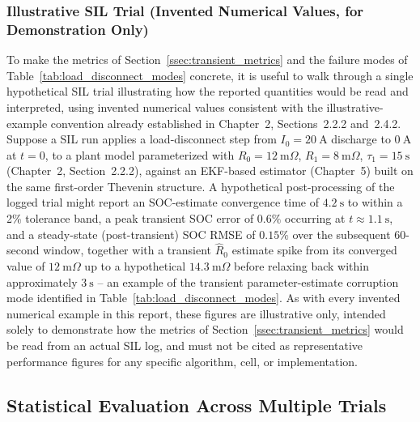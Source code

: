 \subsubsection{Illustrative SIL Trial (Invented Numerical Values, for Demonstration Only)}
\label{sssec:sil_illustrative_example}

To make the metrics of Section~\ref{ssec:transient_metrics} and the failure modes of Table~\ref{tab:load_disconnect_modes} concrete, it is useful to walk through a single hypothetical SIL trial illustrating how the reported quantities would be read and interpreted, using invented numerical values consistent with the illustrative-example convention already established in Chapter~2, Sections~2.2.2 and~2.4.2. Suppose a SIL run applies a load-disconnect step from $I_0 = 20\ \text{A}$ discharge to $0\ \text{A}$ at $t = 0$, to a plant model parameterized with $R_0 = 12\ \text{m}\Omega$, $R_1 = 8\ \text{m}\Omega$, $\tau_1 = 15\ \text{s}$ (Chapter~2, Section~2.2.2), against an EKF-based estimator (Chapter~5) built on the same first-order Thevenin structure. A hypothetical post-processing of the logged trial might report an SOC-estimate convergence time of $4.2\ \text{s}$ to within a 2\% tolerance band, a peak transient SOC error of $0.6\%$ occurring at $t \approx 1.1\ \text{s}$, and a steady-state (post-transient) SOC RMSE of $0.15\%$ over the subsequent 60-second window, together with a transient $\hat{R}_0$ estimate spike from its converged value of $12\ \text{m}\Omega$ up to a hypothetical $14.3\ \text{m}\Omega$ before relaxing back within approximately $3\ \text{s}$ -- an example of the transient parameter-estimate corruption mode identified in Table~\ref{tab:load_disconnect_modes}. As with every invented numerical example in this report, these figures are illustrative only, intended solely to demonstrate how the metrics of Section~\ref{ssec:transient_metrics} would be read from an actual SIL log, and must not be cited as representative performance figures for any specific algorithm, cell, or implementation.

\subsection{Statistical Evaluation Across Multiple Trials}
\label{ssec:sil_monte_carlo}

